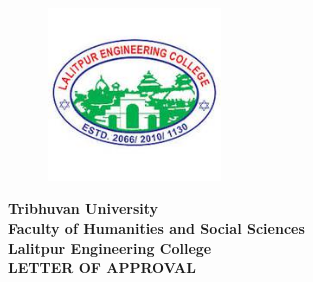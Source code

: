 

\begin{figure}
    \centering
    \includegraphics[width=1.8in]{img/Graphics/LOGO.jpeg}
\end{figure}

\begin{center}
    {\fontsize{14pt}{18}\selectfont
    \textbf{Tribhuvan University\\
    Faculty of Humanities and Social Sciences\\
    Lalitpur Engineering College\\
    \vspace{0.2in}
    LETTER OF APPROVAL\\}
    \vspace{0.2in}}
\end{center}

